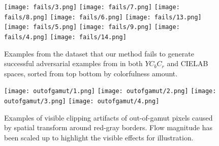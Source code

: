 \begin{figure}[h]
    \texttt{[image: fails/3.png]}
    \texttt{[image: fails/7.png]}
    \texttt{[image: fails/8.png]}
    \texttt{[image: fails/6.png]}
    \texttt{[image: fails/13.png]}
    \texttt{[image: fails/5.png]}
    \texttt{[image: fails/9.png]}
    \texttt{[image: fails/4.png]}
    \texttt{[image: fails/14.png]}
    \caption[Examples from the dataset that our method fails to generate successful adversarial examples from in both \(YC_{b}C_{r}\) and CIELAB spaces]{Examples from the dataset that our method fails to generate successful adversarial examples from in both \(YC_{b}C_{r}\) and CIELAB spaces, sorted from top bottom by colorfulness amount.}\label{fig:fails}
\end{figure}


\begin{figure}[h]
    \texttt{[image: outofgamut/1.png]}
    \texttt{[image: outofgamut/2.png]}
    \texttt{[image: outofgamut/3.png]}
    \texttt{[image: outofgamut/4.png]}
    \caption[Examples of visible clipping artifacts of out-of-gamut pixels caused by spatial transform around red-gray borders.]{Examples of visible clipping artifacts of out-of-gamut pixels caused by spatial transform around red-gray borders. Flow magnitude has been scaled up to highlight the visible effects for illustration.}\label{fig:outofgamut}
\end{figure}

